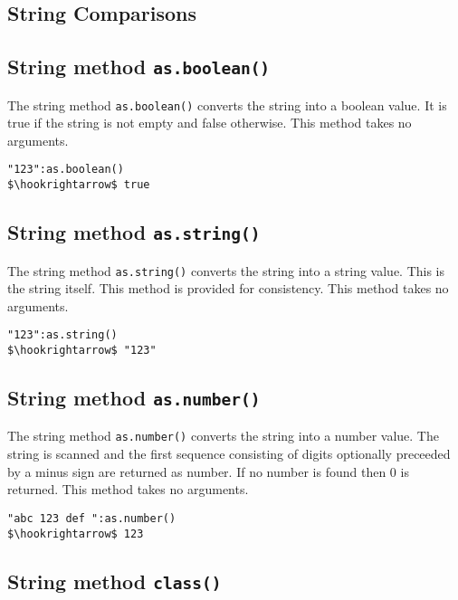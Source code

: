 \documentclass[11pt,a4paper]{scrbook}
\newcommand\method[1]{\texttt{#1}}
\begin{document}
\subsection{String Comparisons}


\subsection{String method \method{as.boolean()}}

The string method \method{as.boolean()} converts the string into a boolean
value. It is true if the string is not empty and false otherwise. This method
takes no arguments.

\begin{lstlisting}[language=BibTool,mathescape=true]
"123":as.boolean()
$\hookrightarrow$ true
\end{lstlisting}

\subsection{String method \method{as.string()}}

The string method \method{as.string()} converts the string into a string
value. This is the string itself. This method is provided for consistency.
This method takes no arguments.

\begin{lstlisting}[language=BibTool,mathescape=true]
"123":as.string()
$\hookrightarrow$ "123"
\end{lstlisting}

\subsection{String method \method{as.number()}}

The string method \method{as.number()} converts the string into a number
value. The string is scanned and the first sequence consisting of digits
optionally preceeded by a minus sign are returned as number. If no number is
found then 0 is returned. This method takes no arguments.

\begin{lstlisting}[language=BibTool,mathescape=true]
"abc 123 def ":as.number()
$\hookrightarrow$ 123
\end{lstlisting}

\subsection{String method \method{class()}}
\end{document}
